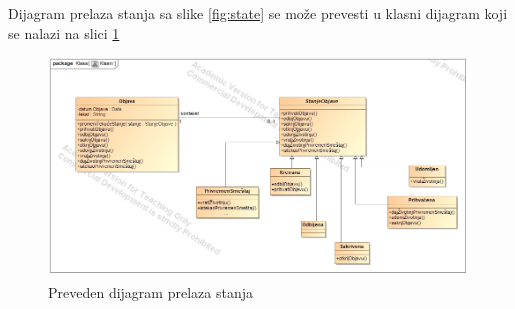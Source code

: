 \par Dijagram prelaza stanja sa slike \ref{fig:state} se može prevesti u klasni dijagram koji se nalazi
na slici \ref{fig:state-class}
\begin{figure}
    \centering
    \includegraphics[height=0.5\textwidth, width=\textwidth]{img/state-class.jpg}
    \caption{Preveden dijagram prelaza stanja}
    \label{fig:state-class}
\end{figure}
